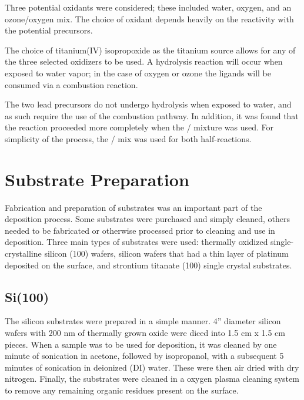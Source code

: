 Three potential oxidants were considered; these included water, oxygen, and an ozone/oxygen mix. The choice of oxidant depends heavily on the reactivity with the potential precursors. 

The choice of titanium(IV) isopropoxide as the titanium source allows for any of the three selected oxidizers to be used. A hydrolysis reaction will occur when exposed to water vapor; in the case of oxygen or ozone the ligands will be consumed via a combustion reaction. 

The two lead precursors do not undergo hydrolysis when exposed to water, and as such require the use of the combustion pathway. In addition, it was found that the reaction proceeded more completely when the / mixture was used. For simplicity of the process, the / mix was used for both half-reactions. 


\section{Substrate Preparation}
\label{sec:SampFab-Substrates}

Fabrication and preparation of substrates was an important part of the deposition process. Some substrates were purchased and simply cleaned, others needed to be fabricated or otherwise processed prior to cleaning and use in deposition. Three main types of substrates were used: thermally oxidized single-crystalline silicon (100) wafers, silicon wafers that had a thin layer of platinum deposited on the surface, and strontium titanate (100) single crystal substrates. 

\subsection{Si(100)} \label{sec:Si}

The silicon substrates were prepared in a simple manner. 4'' diameter silicon wafers with 200 nm of thermally grown oxide were diced into 1.5 cm x 1.5 cm pieces. When a sample was to be used for deposition, it was cleaned by one minute of sonication in acetone, followed by isopropanol, with a subsequent 5 minutes of sonication in deionized (DI) water. These were then air dried with dry nitrogen. Finally, the substrates were cleaned in a oxygen plasma cleaning system to remove any remaining organic residues present on the surface. 


